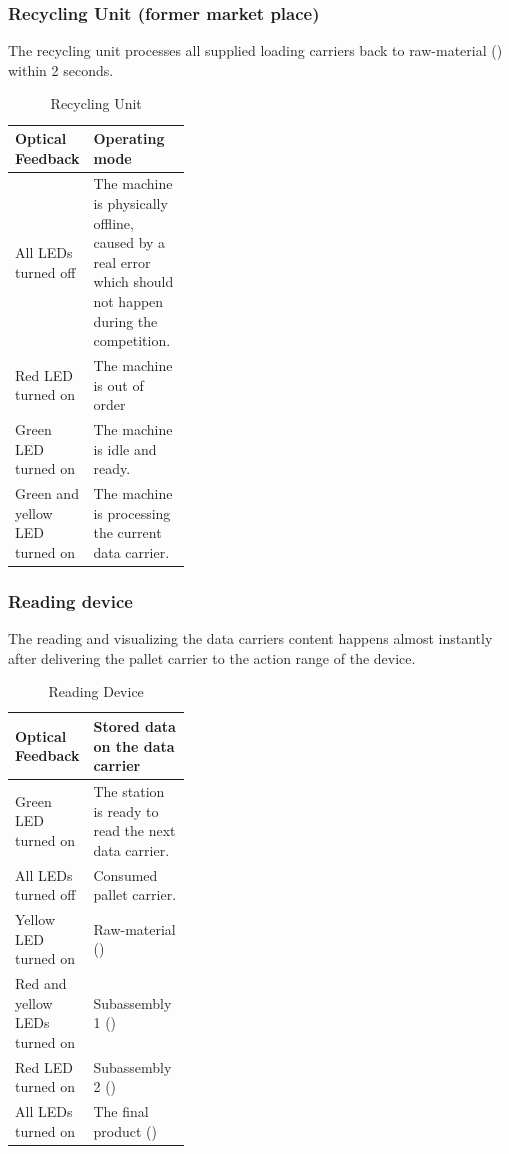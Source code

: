 \documentclass[12pt,twoside]{article}
\begin{document}
\subsubsection{Recycling Unit (former market place)}
The recycling unit processes all supplied loading carriers back to
raw-material () within 2 seconds.

\begin{table}[h]
  \centering
  \begin{tabularx}{\linewidth}{p{0.35\linewidth}|X}
    \multicolumn{1}{l}{Optical Feedback} &\multicolumn{1}{l}{Operating
      mode}\\\hline
    All LEDs turned off & 	The machine is physically offline, caused by a real error which should not happen during the competition.\\
    Red LED turned on & 	The machine is out of order\\
    Green LED turned on & 	The machine is idle and ready.\\
    Green and yellow LED turned on & The machine is processing the
    current data carrier.\\\hline
  \end{tabularx}
  \caption{Recycling Unit}
  \label{tab:recycling-unit}
\end{table}



\subsubsection{Reading device}
The reading and visualizing the data carriers content happens almost
instantly after delivering the pallet carrier to the action range of
the device.

\begin{table}[h]
  \centering
  \begin{tabularx}{\linewidth}{p{0.35\linewidth}|X}
    \multicolumn{1}{l}{Optical Feedback} &\multicolumn{1}{l}{Stored
      data on the data carrier}\\\hline
    Green LED turned on &	The station is ready to read the next data carrier.\\
    All LEDs turned off &	Consumed pallet carrier.\\
    Yellow LED turned on &	Raw-material (\s0) \\
    Red and yellow LEDs turned on & 	Subassembly 1 (\s1)\\
    Red LED turned on &	Subassembly 2 (\s2)\\
    All LEDs turned on & The final product (\p{})\\\hline
  \end{tabularx}
  \caption{Reading Device}
  \label{tab:reading-device}
\end{table}
\end{document}
